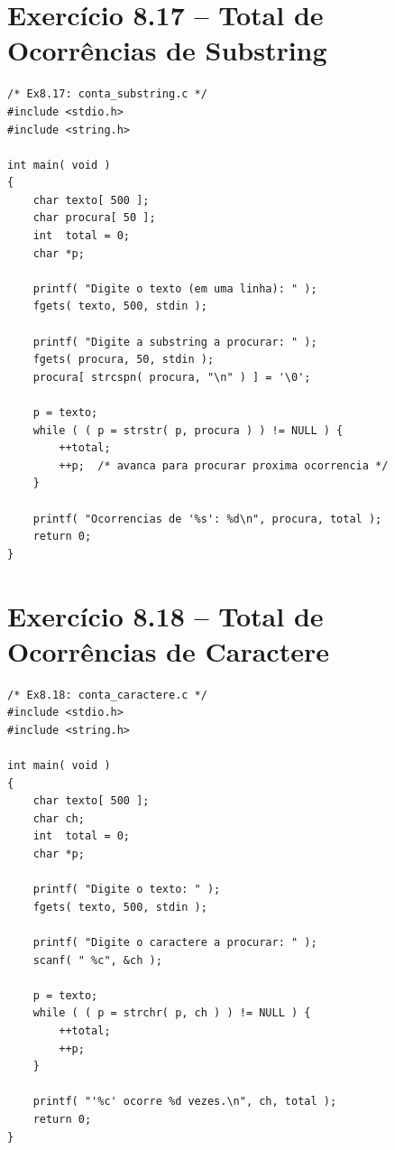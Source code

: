 \documentclass[12pt,a4paper]{article}
\begin{document}
\newpage

\section{Exercício 8.17 -- Total de Ocorrências de Substring}

\begin{respostabox}
\begin{lstlisting}
/* Ex8.17: conta_substring.c */
#include <stdio.h>
#include <string.h>

int main( void )
{
    char texto[ 500 ];
    char procura[ 50 ];
    int  total = 0;
    char *p;

    printf( "Digite o texto (em uma linha): " );
    fgets( texto, 500, stdin );

    printf( "Digite a substring a procurar: " );
    fgets( procura, 50, stdin );
    procura[ strcspn( procura, "\n" ) ] = '\0';

    p = texto;
    while ( ( p = strstr( p, procura ) ) != NULL ) {
        ++total;
        ++p;  /* avanca para procurar proxima ocorrencia */
    }

    printf( "Ocorrencias de '%s': %d\n", procura, total );
    return 0;
}
\end{lstlisting}
\end{respostabox}

\section{Exercício 8.18 -- Total de Ocorrências de Caractere}

\begin{respostabox}
\begin{lstlisting}
/* Ex8.18: conta_caractere.c */
#include <stdio.h>
#include <string.h>

int main( void )
{
    char texto[ 500 ];
    char ch;
    int  total = 0;
    char *p;

    printf( "Digite o texto: " );
    fgets( texto, 500, stdin );

    printf( "Digite o caractere a procurar: " );
    scanf( " %c", &ch );

    p = texto;
    while ( ( p = strchr( p, ch ) ) != NULL ) {
        ++total;
        ++p;
    }

    printf( "'%c' ocorre %d vezes.\n", ch, total );
    return 0;
}
\end{lstlisting}
\end{respostabox}
\end{document}
